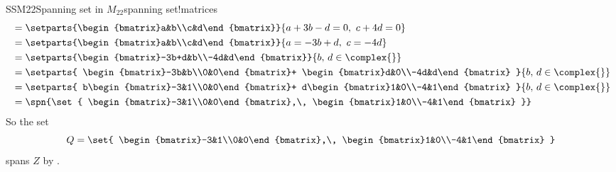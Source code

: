 \begin{example}{SSM22}{Spanning set in $M_{22}$}{spanning set!matrices}
\begin{align*}
&=\setparts{\begin{bmatrix}a&b\\c&d\end{bmatrix}}{a+3b-d=0,\ c+4d=0}\\
&=\setparts{\begin{bmatrix}a&b\\c&d\end{bmatrix}}{a=-3b+d,\ c=-4d}\\
&=\setparts{\begin{bmatrix}-3b+d&b\\-4d&d\end{bmatrix}}{b,\,d\in\complex{\null}}\\
%
&=\setparts{
\begin{bmatrix}-3b&b\\0&0\end{bmatrix}+
\begin{bmatrix}d&0\\-4d&d\end{bmatrix}
}{b,\,d\in\complex{\null}}\\
%
&=\setparts{
b\begin{bmatrix}-3&1\\0&0\end{bmatrix}+
d\begin{bmatrix}1&0\\-4&1\end{bmatrix}
}{b,\,d\in\complex{\null}}\\
%
&=\spn{\set{
\begin{bmatrix}-3&1\\0&0\end{bmatrix},\,
\begin{bmatrix}1&0\\-4&1\end{bmatrix}
}}
%
\end{align*}
%
So the set
%
\begin{equation*}
Q=\set{
\begin{bmatrix}-3&1\\0&0\end{bmatrix},\,
\begin{bmatrix}1&0\\-4&1\end{bmatrix}
}
\end{equation*}
%
spans $Z$ by .
%
\end{example}
%
%

